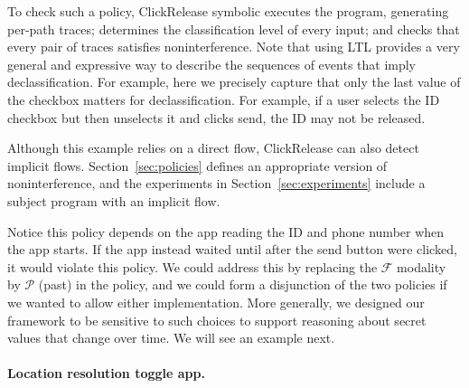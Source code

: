 \documentclass{llncs}
\newcommand{\code}[1]{\textsf{#1}} %
\newcommand{\toolname}{ClickRelease\xspace}
\newcommand{\tfuture}{\mathcal{F}}
\newcommand{\tpast}{\mathcal{P}}
\begin{document}
To check such a policy, \toolname{} symbolic executes the program,
generating per-path traces; determines the classification level of every input; and
checks that every pair of traces satisfies noninterference.
Note that using LTL provides a very general and
expressive way to describe the sequences of events that imply
declassification. For example, here we precisely capture that
only the last value of the checkbox matters for declassification. For
example, if a user selects the ID checkbox but then unselects it
and clicks send, the ID may not be released.

Although this example relies on a direct flow, \toolname{} can also
detect implicit flows. Section~\ref{sec:policies} defines an
appropriate version of noninterference, and the experiments in
Section~\ref{sec:experiments} include a subject program with an
implicit flow.


Notice this policy depends on the app reading the ID
and phone number when the app starts. If the app instead
waited until after the send button were clicked, it would violate this
policy. We could address this by replacing the $\tfuture$ modality by
$\tpast$ (past) in the policy, and we could form a disjunction of the
two policies if we wanted to allow either implementation. More generally, we
designed our framework to be sensitive to such choices to
support  reasoning about secret
values that change over time. We will see an
example next.

\paragraph*{Location resolution toggle app.}
\end{document}

